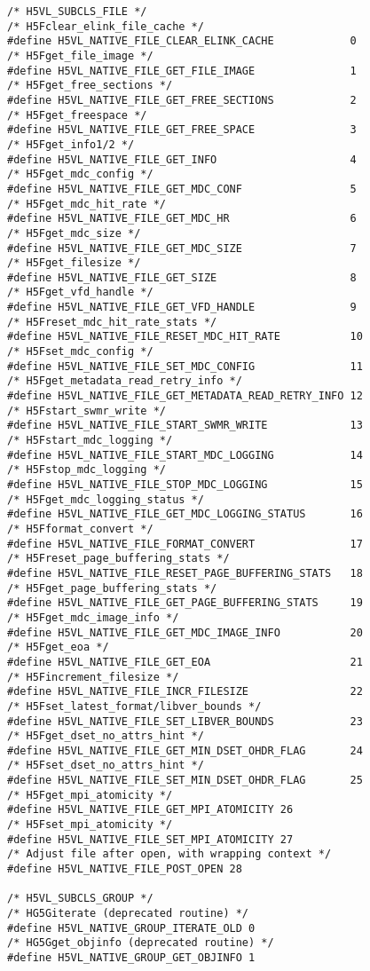\begin{appendices}
\begin{lstlisting}
/* H5VL_SUBCLS_FILE */
/* H5Fclear_elink_file_cache */
#define H5VL_NATIVE_FILE_CLEAR_ELINK_CACHE            0  
/* H5Fget_file_image */
#define H5VL_NATIVE_FILE_GET_FILE_IMAGE               1  
/* H5Fget_free_sections */
#define H5VL_NATIVE_FILE_GET_FREE_SECTIONS            2  
/* H5Fget_freespace */
#define H5VL_NATIVE_FILE_GET_FREE_SPACE               3  
/* H5Fget_info1/2 */
#define H5VL_NATIVE_FILE_GET_INFO                     4  
/* H5Fget_mdc_config */
#define H5VL_NATIVE_FILE_GET_MDC_CONF                 5  
/* H5Fget_mdc_hit_rate */
#define H5VL_NATIVE_FILE_GET_MDC_HR                   6  
/* H5Fget_mdc_size */
#define H5VL_NATIVE_FILE_GET_MDC_SIZE                 7  
/* H5Fget_filesize */
#define H5VL_NATIVE_FILE_GET_SIZE                     8  
/* H5Fget_vfd_handle */
#define H5VL_NATIVE_FILE_GET_VFD_HANDLE               9  
/* H5Freset_mdc_hit_rate_stats */
#define H5VL_NATIVE_FILE_RESET_MDC_HIT_RATE           10 
/* H5Fset_mdc_config */
#define H5VL_NATIVE_FILE_SET_MDC_CONFIG               11 
/* H5Fget_metadata_read_retry_info */
#define H5VL_NATIVE_FILE_GET_METADATA_READ_RETRY_INFO 12 
/* H5Fstart_swmr_write */
#define H5VL_NATIVE_FILE_START_SWMR_WRITE             13 
/* H5Fstart_mdc_logging */
#define H5VL_NATIVE_FILE_START_MDC_LOGGING            14 
/* H5Fstop_mdc_logging */
#define H5VL_NATIVE_FILE_STOP_MDC_LOGGING             15 
/* H5Fget_mdc_logging_status */
#define H5VL_NATIVE_FILE_GET_MDC_LOGGING_STATUS       16 
/* H5Fformat_convert */
#define H5VL_NATIVE_FILE_FORMAT_CONVERT               17 
/* H5Freset_page_buffering_stats */
#define H5VL_NATIVE_FILE_RESET_PAGE_BUFFERING_STATS   18 
/* H5Fget_page_buffering_stats */
#define H5VL_NATIVE_FILE_GET_PAGE_BUFFERING_STATS     19 
/* H5Fget_mdc_image_info */
#define H5VL_NATIVE_FILE_GET_MDC_IMAGE_INFO           20 
/* H5Fget_eoa */
#define H5VL_NATIVE_FILE_GET_EOA                      21 
/* H5Fincrement_filesize */
#define H5VL_NATIVE_FILE_INCR_FILESIZE                22 
/* H5Fset_latest_format/libver_bounds */
#define H5VL_NATIVE_FILE_SET_LIBVER_BOUNDS            23 
/* H5Fget_dset_no_attrs_hint */
#define H5VL_NATIVE_FILE_GET_MIN_DSET_OHDR_FLAG       24 
/* H5Fset_dset_no_attrs_hint */
#define H5VL_NATIVE_FILE_SET_MIN_DSET_OHDR_FLAG       25 
/* H5Fget_mpi_atomicity */
#define H5VL_NATIVE_FILE_GET_MPI_ATOMICITY 26 
/* H5Fset_mpi_atomicity */
#define H5VL_NATIVE_FILE_SET_MPI_ATOMICITY 27 
/* Adjust file after open, with wrapping context */
#define H5VL_NATIVE_FILE_POST_OPEN 28         

/* H5VL_SUBCLS_GROUP */
/* HG5Giterate (deprecated routine) */
#define H5VL_NATIVE_GROUP_ITERATE_OLD 0 
/* HG5Gget_objinfo (deprecated routine) */
#define H5VL_NATIVE_GROUP_GET_OBJINFO 1 


\end{lstlisting}
\end{appendices}
